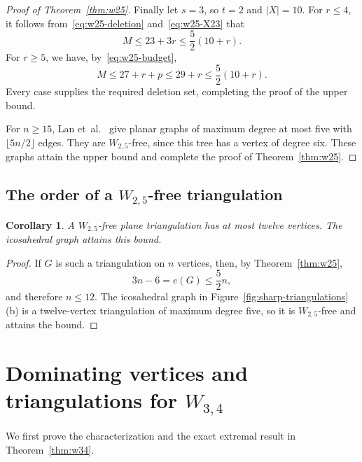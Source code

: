 \documentclass[11pt,a4paper]{article}
\newtheorem{corollary}[theorem]{Corollary}
\theoremstyle{remark}
\begin{document}
\begin{proof}[Proof of Theorem~\ref{thm:w25}]
Finally let $s=3$, so $t=2$ and $|X|=10$. For $r\le4$, it follows from~\eqref{eq:w25-deletion} and~\eqref{eq:w25-X23} that
\[
M\le23+3r\le\frac52(10+r).
\]
For $r\ge5$, we have, by~\eqref{eq:w25-budget},
\[
M\le27+r+p\le29+r\le\frac52(10+r).
\]
Every case supplies the required deletion set, completing the proof of the upper bound.

For $n\ge15$, Lan et~al.~\cite[Theorem~6]{LanShiSong2019} give planar graphs of maximum degree at most five with $\lfloor5n/2\rfloor$ edges. They are $W_{2,5}$-free, since this tree has a vertex of degree six. These graphs attain the upper bound and complete the proof of Theorem~\ref{thm:w25}.
\end{proof}


\subsection{The order of a \texorpdfstring{$W_{2,5}$}{W(2,5)}-free triangulation}

\begin{corollary}\label{prop:w25-triangulation}
A $W_{2,5}$-free plane triangulation has at most twelve vertices. The icosahedral graph attains this bound.
\end{corollary}

\begin{proof}
If $G$ is such a triangulation on $n$ vertices, then, by Theorem~\ref{thm:w25},
\[
3n-6=e(G)\le\frac52n,
\]
and therefore $n\le12$. The icosahedral graph in Figure~\ref{fig:sharp-triangulations}(b) is a twelve-vertex triangulation of maximum degree five, so it is $W_{2,5}$-free and attains the bound.
\end{proof}


\section{Dominating vertices and triangulations for \texorpdfstring{$W_{3,4}$}{W(3,4)}}
\label{sec:w34}

We first prove the characterization and the exact extremal result in
Theorem~\ref{thm:w34}.
\end{document}
